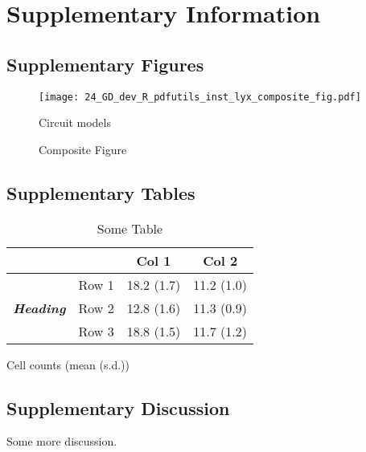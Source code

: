 \documentclass[11pt,british,super,sort&compress]{article}
\providecommand{\tabularnewline}{\\}
\begin{document}
\section{Supplementary Information}


\subsection{Supplementary Figures}

\begin{figure}[H]
\begin{centering}
\texttt{[image: 24\_GD\_dev\_R\_pdfutils\_inst\_lyx\_composite\_fig.pdf]}
\par\end{centering}

\begin{centering}
\caption{\label{fig:S_wtCartoons}Composite Figure}

\par\end{centering}

{\footnotesize Circuit models }
\end{figure}


\clearpage{}


\subsection{Supplementary Tables}

\begin{table}[h]
\begin{centering}
\caption{\textbf{\label{tab:S_cellcounts}}Some Table}

\par\end{centering}

\vspace{0.5cm}


\begin{centering}
\begin{tabular}{|c|c|c|c|}
\cline{3-4} 
\multicolumn{2}{c|}{} &
\textbf{Col 1} &
\textbf{Col 2}\tabularnewline
\hline 
\multirow{3}{*}{\textbf{\emph{Heading}}} &
Row 1 &
18.2 (1.7) &
11.2 (1.0)\tabularnewline
\cline{2-4} 
 & Row 2 &
12.8 (1.6) &
11.3 (0.9)\tabularnewline
\cline{2-4} 
 & Row 3 &
18.8 (1.5) &
11.7 (1.2)\tabularnewline
\hline 
\end{tabular}
\par\end{centering}

\vspace{0.5cm}


{\footnotesize Cell counts (mean (s.d.))}
\end{table}
\clearpage{}


\subsection{Supplementary Discussion}

Some more discussion.
\end{document}
